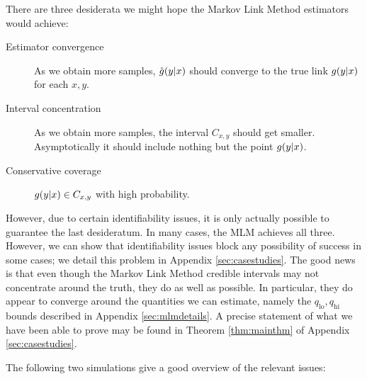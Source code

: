 There are three desiderata we might hope the Markov Link Method estimators would achieve:
\begin{description}
    \item[Estimator convergence] As we obtain more samples, $\hat {g}(y|x)$ should converge to the true link $g(y|x)$ for each $x,y$.
    \item[Interval concentration] As we obtain more samples, the interval $C_{x,y}$ should get smaller. Asymptotically it should include nothing but the point $g(y|x)$.
    \item[Conservative coverage] $g(y|x) \in C_{x,y}$ with high probability.
\end{description}
However, due to certain identifiability issues, it is only actually possible to guarantee the last desideratum.  In many cases, the MLM achieves all three.  However, we can show that identifiability issues block any possibility of success in some cases; we detail this problem in Appendix \ref{sec:casestudies}.  The good news is that even though the Markov Link Method credible intervals may not concentrate around the truth, they do as well as possible.  In particular, they do appear to converge around the quantities we can estimate, namely the $q_\mathrm{lo},q_\mathrm{hi}$ bounds described in Appendix \ref{sec:mlmdetails}.  A precise statement of what we have been able to prove may be found in Theorem \ref{thm:mainthm} of Appendix \ref{sec:casestudies}.

The following two simulations give a good overview of the relevant issues:


